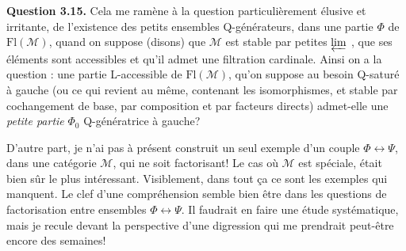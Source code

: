 \documentclass[11pt]{article}
\newcommand{\msp}[1]{\marginpar{\footnotesize [#1]}}
\newcommand{\Fl}{\mathrm{Fl}}
\newcommand{\limproj}{\varprojlim}
\begin{document}
\textbf{Question 3.15.} Cela me ramène à la question particulièrement élusive et irritante, de l'existence des petits ensembles Q-générateurs, dans une partie $\Phi$ de $\Fl(\mathcal{M})$, quand on suppose (disons) que $\mathcal{M}$ est stable par petites $\limproj$ , que ses éléments sont accessibles et qu'il admet une filtration cardinale. Ainsi on a la question : une partie L-accessible de $\Fl(\mathcal{M})$, qu'on suppose au besoin Q-saturé à gauche (ou ce qui revient au même, contenant les isomorphismes, et stable par cochangement de base, par composition et par facteurs directs) admet-elle une \textit{petite partie} $\Phi_0$ Q-génératrice à gauche? %

\marginpar{! \textbar}D'autre part, je n'ai pas à présent construit un seul exemple d'un couple $\Phi \longleftrightarrow \Psi$, dans une catégorie $\mathcal{M}$, qui ne soit factorisant! Le cas où $\mathcal{M}$ est spéciale, était bien sûr le plus intéressant. Visiblement, dans tout
\msp{page 50}
ça ce sont les exemples qui manquent. Le clef d'une compréhension semble bien être dans les questions de factorisation entre ensembles $\Phi \longleftrightarrow \Psi$. Il faudrait en faire une étude systématique, mais je recule devant la perspective d'une digression qui me prendrait peut-être encore des semaines! %
\end{document}
